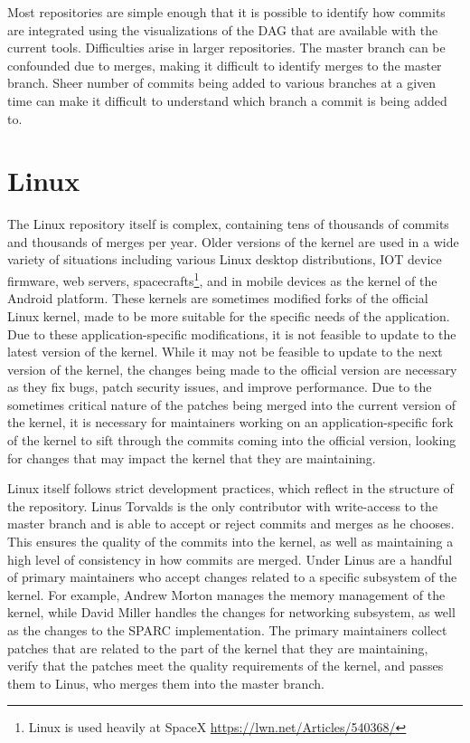 Most repositories are simple enough that it is possible to identify how
commits are integrated using the visualizations of the DAG that are
available with the current tools.
Difficulties arise in larger repositories.
The master branch can be confounded due to \foxtrot{}
merges, making it difficult to identify merges to the master branch.
Sheer number of commits being added to various branches at a given
time can make it difficult to understand which branch a commit is
being added to.

\section{Linux}\label{sec:linux}

The Linux repository itself is complex,
containing tens of thousands of commits and thousands of merges per year.
Older versions of the kernel are used in a wide
variety of situations including various Linux desktop distributions,
IOT device firmware, web servers,
spacecrafts\footnote{Linux is used heavily at SpaceX
  \url{https://lwn.net/Articles/540368/}}, and in mobile devices as the
kernel of the Android platform.
These kernels are sometimes modified forks of the official Linux kernel,
made to be more suitable for the specific needs of the application.
Due to these application-specific modifications,
it is not feasible to update to the latest version of the
kernel.
While it may not be feasible to update to the next version of the kernel,
the changes being made to the official version are necessary as they fix bugs,
patch security issues, and improve performance.
Due to the sometimes critical nature of
the patches being merged into the current version of the kernel, it is
necessary for maintainers working on an application-specific fork of the
kernel to sift through the commits coming into the official version,
looking for changes that may impact the kernel that they are
maintaining.

Linux itself follows strict development practices,
which reflect in the structure of the repository.
Linus Torvalds is the only contributor with write-access to the master
branch and is able to accept or reject commits and merges as he chooses.
This ensures the quality of the commits into the kernel, as well as
maintaining a high level of consistency in how commits are merged.
Under Linus are a handful of primary maintainers who accept changes
related to a specific subsystem of the kernel.
For example, Andrew Morton manages the memory management of the kernel,
while David Miller handles the changes for networking subsystem, as well
as the changes to the SPARC implementation.
The primary maintainers collect patches that are related to the part of
the kernel that they are maintaining, verify that the patches meet the
quality requirements of the kernel, and passes them to Linus, who
merges them into the master branch.

